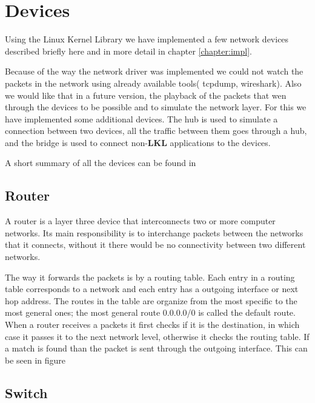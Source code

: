 
\section{Devices}
\label{sec:devices}

Using the Linux Kernel Library we have implemented a few network devices described briefly
here and in more detail in chapter \ref{chapter:impl}.

Because of the way the network driver was implemented we could not watch the packets in the
network using already available tools( tcpdump, wireshark). Also we would like that in a future version,
the playback of the packets that wen through the devices to be possible and to simulate the network layer.
For this we have implemented some additional devices. The hub is used to simulate a connection between 
two devices, all the traffic between them goes through a hub, and the bridge is used to connect non-\textbf{LKL} 
applications to the \text{\project} devices.

A short summary of all the devices can be found in 

\subsection{Router}
\label{sub-sec:router}

A router is a layer three device that interconnects two or more computer networks. Its main responsibility
is to interchange packets between the networks that it connects, without it there would be no connectivity 
between two different networks.

The way it forwards the packets is by a routing table. Each entry in a routing table corresponds to a network
and each entry has a outgoing interface or next hop address. The routes in the table are organize from the most specific
to the most general ones; the most general route 0.0.0.0/0 is called the default route. When a router receives a packets it 
first checks if it is the destination, in which case it passes it to the next network level, otherwise it checks the routing
table. If a match is found than the packet is sent through the outgoing interface. This can be seen in figure 


\subsection{Switch}
\label{sub-sec:switch}

